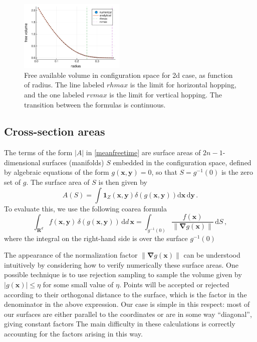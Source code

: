 \documentclass[superscriptaddress,pre,reprint,showpacs,twocolumn]{revtex4-1}
\newcommand{\rd}[1]{\mathrm{d}{#1} \,}
\newcommand{\indicatorsymbol}{\mathbf{1}}
\begin{document}
\begin{figure}[h]
\centering
\includegraphics[width=0.45\textwidth]{./figures/freevolume01.pdf}
\caption{Free available volume in configuration space for 2d case,
  as function of radius. The
  line labeled $rhmax$ is the limit for horizontal hopping, and the one labeled
  $rvmax$ is the limit for vertical hopping. The transition between the formulas
is continuous.}
\label{VolMonteC}%
\end{figure}


\subsection{Cross-section areas}\label{areas}

The terms of the form $|A|$ in \eqref{meanfreetime} are surface areas of
$2n-1$-dimensional surfaces (manifolds) $S$ embedded in the configuration space,
defined by algebraic equations of the form $g(\mathbf{x}, \mathbf{y}) = 0$,
so that $S = g^{-1}(0)$ is the zero set of $g$.
The surface area of $S$ is then given by
\begin{equation}
  A(S) = \int \indicatorsymbol_Z(\mathbf{x ,y}) \delta(g(\mathbf{x, y}))
   \rd{\mathbf{x}} \rd{\mathbf{y}}.
\label{eq:surface-area}
\end{equation}
To evaluate this, we use the following coarea formula
\cite[section 6.1]{Hormander83} 
\begin{equation}
\int_{\mathbf{R}^d} f(\mathbf{x,y}) \, \delta(g(\mathbf{x,y})) \, \rd{d} \mathbf{x} = \int_{g^{-1}(0)}\frac{f(\mathbf{x})}{\| \mathbf{\nabla}g(\mathbf{x}) \|} \, \rd{S},
\label{eq:surface-dirac}
\end{equation}
where the integral on the right-hand side is over the surface $g^{-1}(0)$
\cite{Zappa2018}

The appearance of the normalization factor $\| \mathbf{\nabla}g(\mathbf{x}) \|$ can be understood intuitively by considering how to verify numerically these surface areas. One possible technique is to use rejection sampling to sample the volume given by $|g(\mathbf{x})| \le \eta$ for some small value of $\eta$. Points will be accepted or rejected according to their orthogonal distance to the surface, which is the factor in the denominator in the above expression. Our case is simple in this respect: most of our surfaces are either parallel to the coordinates or are in some way ``diagonal'', giving constant factors
The main difficulty in these calculations is correctly accounting for the factors arising in this way.
\end{document}
